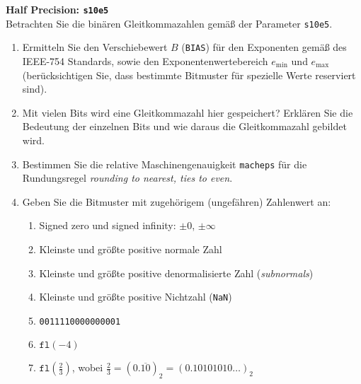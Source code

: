 \textbf{Half Precision: \texttt{s10e5}}\\
Betrachten Sie die binären Gleitkommazahlen gemäß der Parameter \texttt{s10e5}.
\begin{enumerate}
	\item Ermitteln Sie den Verschiebewert $B$ (\texttt{BIAS}) für den Exponenten gemäß des IEEE-754 Standards, sowie den Exponentenwertebereich $e_{\text{min}}$ und $e_{\text{max}}$ (berücksichtigen Sie, dass bestimmte Bitmuster für spezielle Werte reserviert sind).
	\item Mit vielen Bits wird eine Gleitkommazahl hier gespeichert? Erklären Sie die Bedeutung der einzelnen Bits und wie daraus die Gleitkommazahl gebildet wird.
	\item Bestimmen Sie die relative Maschinengenauigkeit \texttt{macheps} für die Rundungsregel \textit{rounding to nearest, ties to even}.
	\item Geben Sie die Bitmuster mit zugehörigem (ungefähren) Zahlenwert an:
	\begin{enumerate}
		\item Signed zero und signed infinity:  $\pm 0$, $\pm \infty$
		\item Kleinste und größte positive normale Zahl
		\item Kleinste und größte positive denormalisierte Zahl (\textit{subnormals})
		\item Kleinste und größte positive Nichtzahl (\texttt{NaN})
		\item \texttt{0011110000000001}
		\item $\texttt{fl}(-4)$
		\item $\texttt{fl}(\frac{2}{3})$, wobei $\frac{2}{3} = (0.\overline{10})_2=(0.10101010\ldots)_2$
	\end{enumerate}
\end{enumerate}